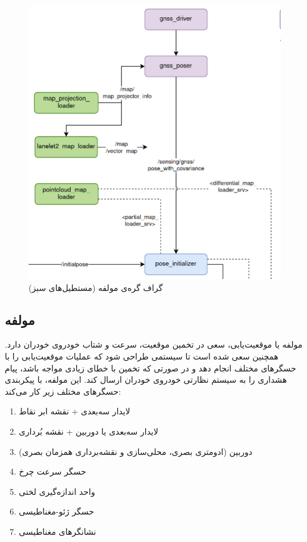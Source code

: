 \begin{figure}[h!]
    \centering
    \includegraphics[width=0.75\linewidth]{figures/Autoware_Map_Node_Graph.png}
    \caption{گراف گره‌ی مولفه  (مستطیل‌های سبز) \cite{Autoware:Documentation}}
    \label{fig:Autoware_Map_Node_Graph}
\end{figure}

\subsection{مولفه }
مولفه  یا موقعیت‌یابی، سعی در تخمین موقعیت، سرعت و شتاب خودروی خودران دارد. همچنین سعی شده است تا سیستمی طراحی شود که عملیات موقعیت‌یابی را با حسگر‌های مختلف انجام دهد و در صورتی که تخمین با خطای زیادی مواجه باشد، پیام هشداری را به سیستم نظارتی خودروی خودران ارسال کند.
این مولفه، با پیکربندی حسگر‌های مختلف زیر کار می‌کند:
\begin{enumerate}
    \item لایدار سه‌بعدی + نقشه ابر نقاط
    \item لایدار سه‌بعدی یا دوربین + نقشه بُرداری
    \item  دوربین (ادومتری بصری،‌ محلی‌سازی و نقشه‌برداری همزمان بصری)
    \item حسگر سرعت چرخ
    \item واحد اندازه‌گیری لختی 
    \item حسگر ژئو-مغناطیسی
    \item نشانگرهای مغناطیسی
\end{enumerate}

